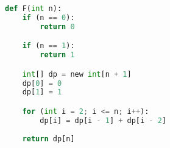 \documentclass[preview]{standalone}
\begin{document}
\begin{center}
\begin{lstlisting}[language=Python]
def F(int n):
    if (n == 0):
        return 0

    if (n == 1):
        return 1

    int[] dp = new int[n + 1]
    dp[0] = 0
    dp[1] = 1

    for (int i = 2; i <= n; i++):
        dp[i] = dp[i - 1] + dp[i - 2]
    
    return dp[n]
\end{lstlisting}
\end{center}
\end{document}
